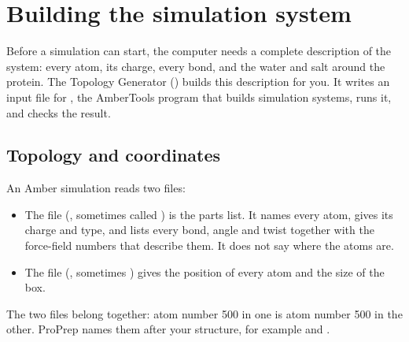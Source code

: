 \chapter{Building the simulation system}
\label{ch:topology}

Before a simulation can start, the computer needs a complete description of
the system: every atom, its charge, every bond, and the water and salt around
the protein. The Topology Generator () builds this description for
you. It writes an input file for , the AmberTools program that
builds simulation systems, runs it, and checks the result.

\begin{glance}
\end{glance}

\section{Topology and coordinates}\label{sec:topology-files}

An Amber simulation reads two files:

\begin{itemize}
  \item The  file (, sometimes called
        ) is the parts list. It names every atom, gives its
        charge and type, and lists every bond, angle and twist together with
        the force-field numbers that describe them. It does not say where
        the atoms are.
  \item The  file (, sometimes )
        gives the position of every atom and the size of the box.
\end{itemize}

The two files belong together: atom number 500 in one is atom number 500 in
the other. ProPrep names them after your structure, for example
 and .

